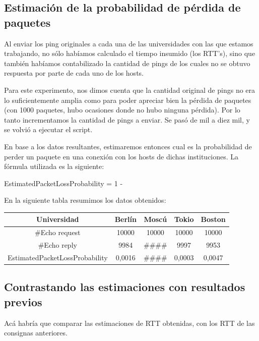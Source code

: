 \subsection{Estimación de la probabilidad de pérdida de paquetes}

Al enviar los ping originales a cada una de las universidades con las que estamos trabajando, no sólo habíamos calculado el tiempo insumido (los RTT's), sino que también habíamos contabilizado la cantidad de pings de los cuales no se obtuvo respuesta por parte de cada uno de los hosts. 

Para este experimento, nos dimos cuenta que la cantidad original de pings no era lo suficientemente amplia como para poder apreciar bien la pérdida de paquetes (con 1000 paquetes, hubo ocasiones donde no hubo ninguna pérdida). Por lo tanto incrementamos la cantidad de pings a enviar. Se pasó de mil a diez mil, y se volvió a ejecutar el script.

En base a los datos resultantes, estimaremos entonces cual es la probabilidad de perder un paquete en una conexión con los hosts de dichas instituciones. La fórmula utilizada es la siguiente:

\begin{center}
EstimatedPacketLossProbability = 1 - 
\end{center}

En la siguiente tabla resumimos los datos obtenidos:

\begin{center}
 \begin{tabular}{|c||c|c|c|c|}
    \hline
    Universidad & Berlín & Moscú & Tokio & Boston \\ \hline \hline
    #Echo request & 10000 & 10000 & 10000 & 10000 \\ \hline
    #Echo reply & 9984 & #### & 9997 & 9953 \\ \hline
    EstimatedPacketLossProbability & 0,0016 & #### & 0,0003 & 0,0047 \\ \hline
 \end{tabular}
\end{center}

\subsection{Contrastando las estimaciones con resultados previos}

Acá habría que comparar las estimaciones de RTT obtenidas, con los RTT de las consignas anteriores.

